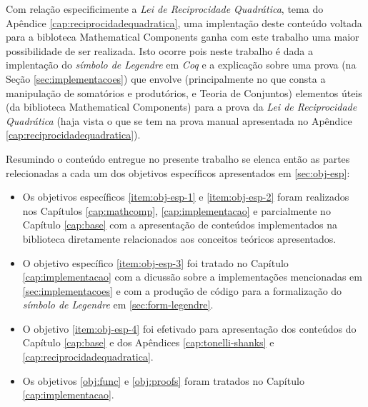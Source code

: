 Com relação especificimente a \textit{Lei de Reciprocidade Quadrática}, tema do Apêndice \ref{cap:reciprocidadequadratica}, uma implentação deste conteúdo voltada para a bibloteca Mathematical Components ganha com este trabalho uma maior possibilidade de ser realizada. Isto ocorre pois neste trabalho é dada a implentação do \textit{símbolo de Legendre} em \textit{Coq} e a explicação sobre uma prova (na Seção \ref{sec:implementacoes}) que envolve (principalmente no que consta a manipulação de somatórios e produtórios, e Teoria de Conjuntos) elementos úteis (da biblioteca Mathematical Components) para a prova da \textit{Lei de Reciprocidade Quadrática} (haja vista o que se tem na prova manual apresentada no Apêndice \ref{cap:reciprocidadequadratica}).

Resumindo o conteúdo entregue no presente trabalho se elenca então as partes relecionadas a cada um dos objetivos específicos apresentados em \ref{sec:obj-esp}: 
\begin{itemize}
    \item Os objetivos específicos \ref{item:obj-esp-1} e \ref{item:obj-esp-2} foram realizados nos Capítulos \ref{cap:mathcomp}, \ref{cap:implementacao} e parcialmente no Capítulo \ref{cap:base} com a apresentação de conteúdos implementados na biblioteca diretamente relacionados aos conceitos teóricos apresentados.  
    
    \item O objetivo específico \ref{item:obj-esp-3} foi tratado no Capítulo \ref{cap:implementacao} com a dicussão sobre a implementações mencionadas em \ref{sec:implementacoes} e com a produção de código para a formalização do \textit{símbolo de Legendre} em \ref{sec:form-legendre}.
    
    \item O objetivo \ref{item:obj-esp-4} foi efetivado para apresentação dos conteúdos do Capítulo \ref{cap:base} e dos Apêndices \ref{cap:tonelli-shanks} e \ref{cap:reciprocidadequadratica}.
    
    \item Os objetivos \ref{obj:func} e \ref{obj:proofs} foram tratados no Capítulo \ref{cap:implementacao}.
\end{itemize}

